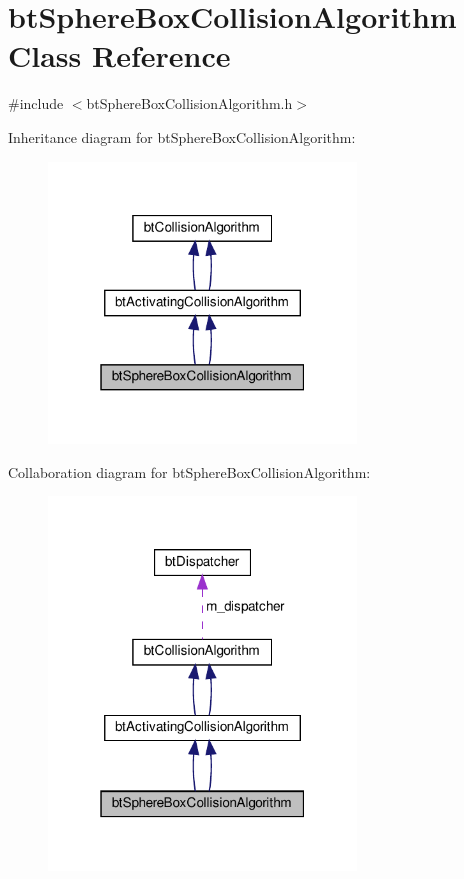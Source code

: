 \hypertarget{classbtSphereBoxCollisionAlgorithm}{}\section{bt\+Sphere\+Box\+Collision\+Algorithm Class Reference}
\label{classbtSphereBoxCollisionAlgorithm}


{\ttfamily \#include $<$bt\+Sphere\+Box\+Collision\+Algorithm.\+h$>$}



Inheritance diagram for bt\+Sphere\+Box\+Collision\+Algorithm\+:
\nopagebreak
\begin{figure}[H]
\begin{center}
\leavevmode
\includegraphics[width=232pt]{classbtSphereBoxCollisionAlgorithm__inherit__graph}
\end{center}
\end{figure}


Collaboration diagram for bt\+Sphere\+Box\+Collision\+Algorithm\+:
\nopagebreak
\begin{figure}[H]
\begin{center}
\leavevmode
\includegraphics[width=232pt]{classbtSphereBoxCollisionAlgorithm__coll__graph}
\end{center}
\end{figure}
